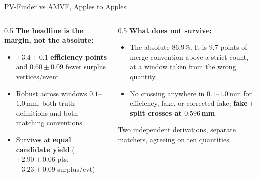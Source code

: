 \documentclass[xcolor=table,aspectratio=169]{beamer}
\begin{document}
\begin{frame}{PV-Finder vs AMVF, Apples to Apples}
    \begin{columns}[t]
        \begin{column}{0.5\linewidth}
            \footnotesize
            \textbf{The headline is the margin, not the absolute:}
            \begin{itemize}\setlength\itemsep{0.15em}
                \item \textcolor{pennred}{$\mathbf{+3.4 \pm 0.1}$ \textbf{efficiency
                    points}} and $\mathbf{0.60 \pm 0.09}$ fewer surplus vertices/event
                \item Robust across windows $0.1$--$1.0$\,mm, both truth definitions
                    and both matching conventions
                \item Survives at \textbf{equal candidate yield}
                    ($+2.90\pm0.06$ pts, $-3.23\pm0.09$ surplus/evt)
            \end{itemize}
        \end{column}
        \begin{column}{0.5\linewidth}
            \footnotesize
            \textbf{What does not survive:}
            \begin{itemize}\setlength\itemsep{0.15em}
                \item The absolute $86.9\%$. It is $9.7$ points of merge convention
                    above a strict count, at a window taken from the wrong quantity
                \item No crossing anywhere in $0.1$--$1.0$\,mm for efficiency, fake,
                    or corrected fake; \textbf{fake\,$+$\,split crosses at $0.596$\,mm}
            \end{itemize}
            \vspace{0.2em}
            {\scriptsize\textcolor{black!55}{Two independent derivations, separate
            matchers, agreeing on ten quantities.}}
        \end{column}
    \end{columns}
\end{frame}
\end{document}

